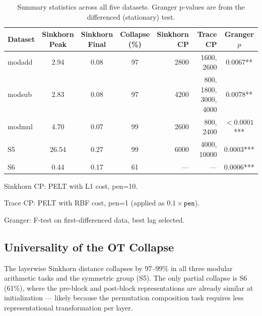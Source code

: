 \documentclass[12pt,twoside]{article}
\begin{document}
\begin{table}[t]
  \centering
  \caption{Summary statistics across all five datasets. Granger p-values are
           from the differenced (stationary) test.}
  \label{tab:summary}
  \begin{threeparttable}
  \begin{tabular}{lcccrrc}
    \toprule
    Dataset & \makecell[c]{Sinkhorn\\Peak} & \makecell[c]{Sinkhorn\\Final} & \makecell[c]{Collapse\\(\%)} &
    \makecell[c]{Sinkhorn\\CP} & \makecell[c]{Trace\\CP} & \makecell[c]{Granger\\\(p\)} \\
    \midrule
    modadd & 2.94 & 0.08 & 97 & 2800 & 1600, 2600 & 0.0067** \\
    modsub & 2.83 & 0.08 & 97 & 4200 & 800, 1800, 3000, 4000 & 0.0078** \\
    modmul & 4.70 & 0.07 & 99 & 2600 & 800, 2400 & \(<0.0001\)*** \\
    S5 & 26.54 & 0.27 & 99 & 6000 & 4000, 10000 & 0.0003*** \\
    S6 & 0.44 & 0.17 & 61 & --- & --- & 0.0006*** \\
    \bottomrule
  \end{tabular}
  \begin{tablenotes}
    \small
    \item Sinkhorn CP: PELT with L1 cost, pen=10.
    \item Trace CP: PELT with RBF cost, pen=1 (applied as $0.1 \times \texttt{pen}$).
    \item Granger: F-test on first-differenced data, best lag selected.
  \end{tablenotes}
  \end{threeparttable}
\end{table}

\subsection{Universality of the OT Collapse}

The layerwise Sinkhorn distance collapses by 97--99\% in all three modular
arithmetic tasks and the symmetric group (S5). The only partial collapse is
S6 (61\%), where the pre-block and post-block representations are already
similar at initialization --- likely because the permutation composition task
requires less representational transformation per layer.
\end{document}
